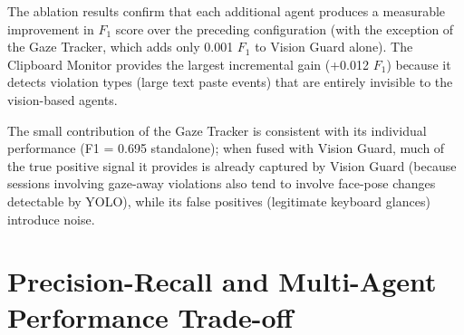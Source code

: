 \begin{table}[htbp]
    \centering
    \caption{Incremental agent addition ablation study. Each row adds one agent to the fusion pipeline. Performance is measured on the 160-session development set using 5-fold cross-validation.}
    \label{tab:ablation}
\end{table}

The ablation results confirm that each additional agent produces a measurable improvement in $F_1$ score over the preceding configuration (with the exception of the Gaze Tracker, which adds only 0.001 $F_1$ to Vision Guard alone). The Clipboard Monitor provides the largest incremental gain (+0.012 $F_1$) because it detects violation types (large text paste events) that are entirely invisible to the vision-based agents.

The small contribution of the Gaze Tracker is consistent with its individual performance (F1 = 0.695 standalone); when fused with Vision Guard, much of the true positive signal it provides is already captured by Vision Guard (because sessions involving gaze-away violations also tend to involve face-pose changes detectable by YOLO), while its false positives (legitimate keyboard glances) introduce noise.

\section{Precision-Recall and Multi-Agent Performance Trade-off}

